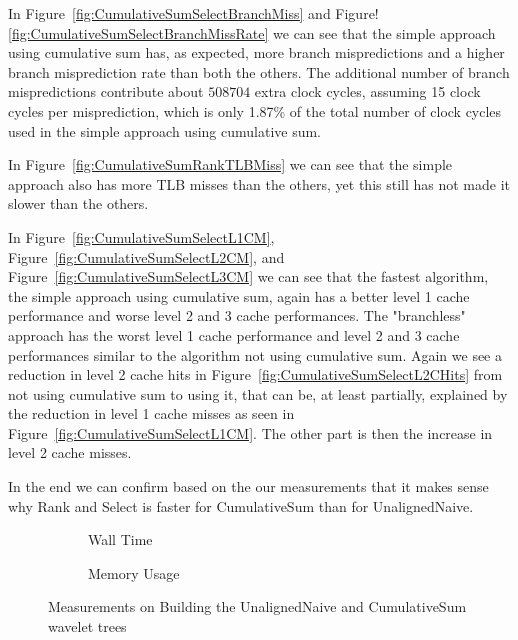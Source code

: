 In Figure~\ref{fig:CumulativeSumSelectBranchMiss} and Figure!\ref{fig:CumulativeSumSelectBranchMissRate} we can see that the simple approach using cumulative sum has, as expected, more branch mispredictions and a higher branch misprediction rate than both the others.
The additional number of branch mispredictions contribute about $\num{508704}$ extra clock cycles, assuming 15 clock cycles per misprediction, which is only 1.87\% of the total number of clock cycles used in the simple approach using cumulative sum.

In Figure~\ref{fig:CumulativeSumRankTLBMiss} we can see that the simple approach also has more TLB misses than the others, yet this still has not made it slower than the others.

In Figure~\ref{fig:CumulativeSumSelectL1CM}, Figure~\ref{fig:CumulativeSumSelectL2CM}, and Figure~\ref{fig:CumulativeSumSelectL3CM} we can see that the fastest algorithm, the simple approach using cumulative sum, again has a better level 1 cache performance and worse level 2 and 3 cache performances.
The "branchless" approach has the worst level 1 cache performance and level 2 and 3 cache performances similar to the algorithm not using cumulative sum.
Again we see a reduction in level 2 cache hits in Figure~\ref{fig:CumulativeSumSelectL2CHits} from not using cumulative sum to using it, that can be, at least partially, explained by the reduction in level 1 cache misses as seen in Figure~\ref{fig:CumulativeSumSelectL1CM}.
The other part is then the increase in level 2 cache misses.

In the end we can confirm based on the our measurements that it makes sense why Rank and Select is faster for CumulativeSum than for UnalignedNaive.







\begin{figure}\tiny
\begin{subfigure}{0.48\textwidth}
	
	\caption{Wall Time}
	\label{fig:CumulativeSumBuildWalltime}
\end{subfigure}
\hfill
\begin{subfigure}{0.48\textwidth}
	
	\caption{Memory Usage}
	\label{fig:CumulativeSumBuildMemoryUsage}
\end{subfigure}
\caption{Measurements on Building the UnalignedNaive and CumulativeSum wavelet trees}
\label{fig:CumulativeSumBuild}
\end{figure}


